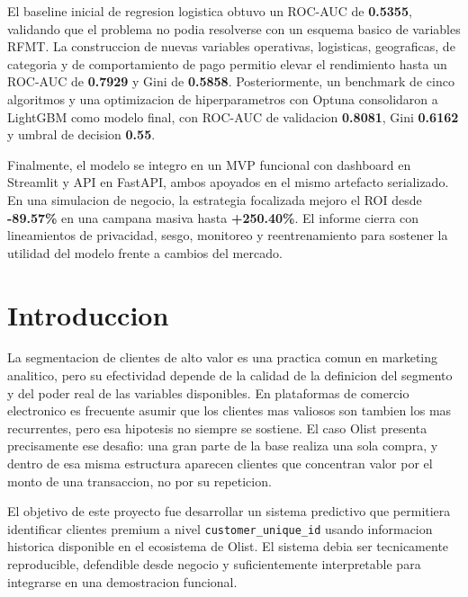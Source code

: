 \documentclass[12pt,letterpaper]{article}
\begin{document}
El baseline inicial de regresion logistica obtuvo un ROC-AUC de \textbf{0.5355}, validando que el problema no podia resolverse con un esquema basico de variables RFMT. La construccion de nuevas variables operativas, logisticas, geograficas, de categoria y de comportamiento de pago permitio elevar el rendimiento hasta un ROC-AUC de \textbf{0.7929} y Gini de \textbf{0.5858}. Posteriormente, un benchmark de cinco algoritmos y una optimizacion de hiperparametros con Optuna consolidaron a LightGBM como modelo final, con ROC-AUC de validacion \textbf{0.8081}, Gini \textbf{0.6162} y umbral de decision \textbf{0.55}.

Finalmente, el modelo se integro en un MVP funcional con dashboard en Streamlit y API en FastAPI, ambos apoyados en el mismo artefacto serializado. En una simulacion de negocio, la estrategia focalizada mejoro el ROI desde \textbf{-89.57\%} en una campana masiva hasta \textbf{+250.40\%}. El informe cierra con lineamientos de privacidad, sesgo, monitoreo y reentrenamiento para sostener la utilidad del modelo frente a cambios del mercado.

\section{Introduccion}
La segmentacion de clientes de alto valor es una practica comun en marketing analitico, pero su efectividad depende de la calidad de la definicion del segmento y del poder real de las variables disponibles. En plataformas de comercio electronico es frecuente asumir que los clientes mas valiosos son tambien los mas recurrentes, pero esa hipotesis no siempre se sostiene. El caso Olist presenta precisamente ese desafio: una gran parte de la base realiza una sola compra, y dentro de esa misma estructura aparecen clientes que concentran valor por el monto de una transaccion, no por su repeticion.

El objetivo de este proyecto fue desarrollar un sistema predictivo que permitiera identificar clientes premium a nivel \texttt{customer\_unique\_id} usando informacion historica disponible en el ecosistema de Olist. El sistema debia ser tecnicamente reproducible, defendible desde negocio y suficientemente interpretable para integrarse en una demostracion funcional.
\end{document}

